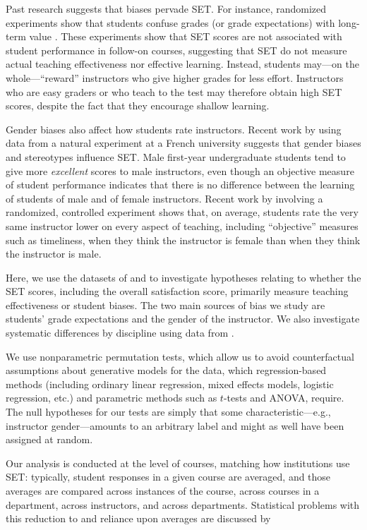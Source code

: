 \documentclass[12pt]{article}
\begin{document}
Past research suggests that biases pervade SET. 
For instance, randomized experiments show that students confuse grades (or grade expectations) with long-term value \citep{Carrell2010a,Braga2014}. 
These experiments show that SET scores are not associated with student performance in follow-on courses, suggesting that SET do not measure actual teaching effectiveness nor effective learning. 
Instead, students may---on the whole---``reward'' instructors who give higher grades for
less effort. 
Instructors who are easy graders or who teach to the test may therefore obtain high SET scores, 
despite the fact that they encourage shallow learning.    

Gender biases also affect how students rate instructors.
Recent work by \citet{Boring2015} using data from a natural experiment at a French university
suggests that gender biases and stereotypes influence SET. 
Male first-year undergraduate students tend to give more \textit{excellent} scores to male instructors,
even though an objective measure of student performance indicates that there is no difference between
the learning of students of male and of female instructors.
Recent work by \citet{MacNell2014} involving a randomized, controlled experiment shows that, on average, students rate the very same instructor lower on every aspect of teaching,
including ``objective'' measures such as timeliness, when they think the instructor is 
female than when they think the instructor is male. 

Here, we use the datasets of \citet{Boring2015} and \citet{MacNell2014} to investigate 
hypotheses relating to whether the SET scores, including the overall satisfaction score, 
primarily measure teaching effectiveness or student biases. 
The two main sources of bias we study are students' grade expectations and the gender of the 
instructor. 
We also investigate systematic differences by discipline using data from \citet{Boring2015}.

We use nonparametric permutation tests, which allow us to avoid counterfactual assumptions about
generative models for the data, which regression-based methods (including
ordinary linear regression, mixed effects models, logistic regression, etc.) and parametric
methods such as $t$-tests and ANOVA, require.
The null hypotheses for our tests are simply that some 
characteristic---e.g., instructor gender---amounts to an arbitrary label and might as well
have been assigned at random. 

Our analysis is conducted at the level of courses, matching how institutions use SET: 
typically, student responses in a given course
are averaged, and those averages are compared across instances of the course,
across courses in a department, across instructors, and across departments.
Statistical problems with this reduction to and reliance upon averages are 
discussed by \citet{StarkFreishtat2014}
\end{document}

